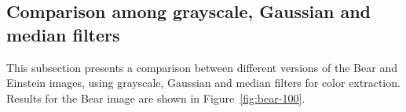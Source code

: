 \documentclass[]{IEEEtran}
\begin{document}

\subsection{Comparison among grayscale, Gaussian and median filters}

This subsection presents a comparison between different versions of the Bear and Einstein images, using grayscale, Gaussian and median filters for color extraction. Results for the Bear image are shown in Figure~\ref{fig:bear-100}.



\end{document}
